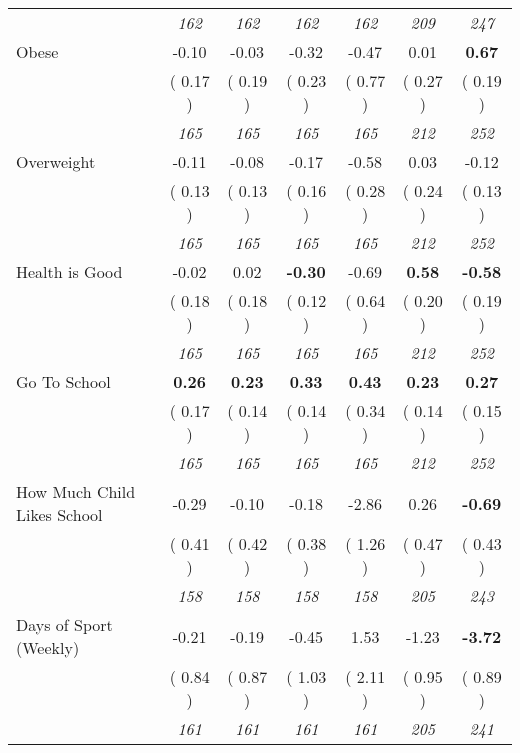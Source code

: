 \begin{tabular}{l c c c c c c}
& \textit{ 162 } & \textit{ 162 } & \textit{ 162 } & \textit{ 162 } & \textit{ 209 } & \textit{ 247 } \\
Obese &     -0.10 &     -0.03 &     -0.32 &     -0.47 &      0.01 & \textbf{      0.67 } \\
& (     0.17 ) & (     0.19 ) & (     0.23 ) & (     0.77 ) & (     0.27 ) & (     0.19 ) \\
& \textit{ 165 } & \textit{ 165 } & \textit{ 165 } & \textit{ 165 } & \textit{ 212 } & \textit{ 252 } \\
Overweight &     -0.11 &     -0.08 &     -0.17 &     -0.58 &      0.03 &     -0.12 \\
& (     0.13 ) & (     0.13 ) & (     0.16 ) & (     0.28 ) & (     0.24 ) & (     0.13 ) \\
& \textit{ 165 } & \textit{ 165 } & \textit{ 165 } & \textit{ 165 } & \textit{ 212 } & \textit{ 252 } \\
Health is Good &     -0.02 &      0.02 & \textbf{     -0.30 } &     -0.69 & \textbf{      0.58 } & \textbf{     -0.58 } \\
& (     0.18 ) & (     0.18 ) & (     0.12 ) & (     0.64 ) & (     0.20 ) & (     0.19 ) \\
& \textit{ 165 } & \textit{ 165 } & \textit{ 165 } & \textit{ 165 } & \textit{ 212 } & \textit{ 252 } \\
Go To School & \textbf{      0.26 } & \textbf{      0.23 } & \textbf{      0.33 } & \textbf{     0.43} & \textbf{      0.23 } & \textbf{      0.27 } \\
& (     0.17 ) & (     0.14 ) & (     0.14 ) & (     0.34 ) & (     0.14 ) & (     0.15 ) \\
& \textit{ 165 } & \textit{ 165 } & \textit{ 165 } & \textit{ 165 } & \textit{ 212 } & \textit{ 252 } \\
How Much Child Likes School &     -0.29 &     -0.10 &     -0.18 &     -2.86 &      0.26 & \textbf{     -0.69 } \\
& (     0.41 ) & (     0.42 ) & (     0.38 ) & (     1.26 ) & (     0.47 ) & (     0.43 ) \\
& \textit{ 158 } & \textit{ 158 } & \textit{ 158 } & \textit{ 158 } & \textit{ 205 } & \textit{ 243 } \\
Days of Sport (Weekly) &     -0.21 &     -0.19 &     -0.45 &      1.53 &     -1.23 & \textbf{     -3.72 } \\
& (     0.84 ) & (     0.87 ) & (     1.03 ) & (     2.11 ) & (     0.95 ) & (     0.89 ) \\
& \textit{ 161 } & \textit{ 161 } & \textit{ 161 } & \textit{ 161 } & \textit{ 205 } & \textit{ 241 } \\
\bottomrule
\end{tabular}
